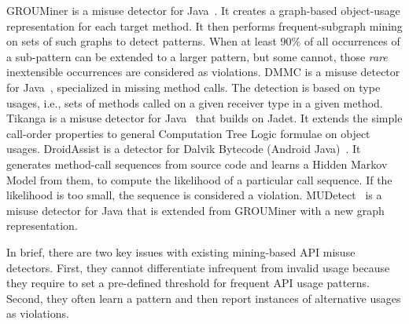 GROUMiner is a misuse detector for Java~\cite{NNP+09}.  It creates a
graph-based object-usage representation for each target method.
It then performs frequent-subgraph mining on sets of such graphs to
detect patterns.  When at least 90\% of all occurrences of a
sub-pattern can be extended to a larger pattern, but some cannot,
those \emph{rare} inextensible occurrences are considered as
violations. DMMC is a misuse detector for Java~\cite{MBM10},
specialized in missing method calls.  The detection is based on type
usages, i.e., sets of methods called on a given receiver type in a
given method.
Tikanga is a misuse detector for Java~\cite{WZ11} that builds on
Jadet.  It extends the simple call-order properties to general
Computation Tree Logic formulae on object usages. DroidAssist is a
detector for Dalvik Bytecode (Android Java)~\cite{NPVN16}.  It
generates method-call sequences from source code and learns a Hidden
Markov Model from them, to compute the likelihood of a particular call
sequence. If the likelihood is too small, the sequence is considered a
violation. MUDetect~\cite{msr19} is a misuse detector for Java that is
extended from GROUMiner with a new graph representation.

In brief, there are two key issues with existing mining-based API
misuse detectors. First, they cannot differentiate infrequent from
invalid usage because they require to set a pre-defined threshold for
frequent API usage patterns. Second, they often learn a pattern and
then report instances of alternative usages as violations.
